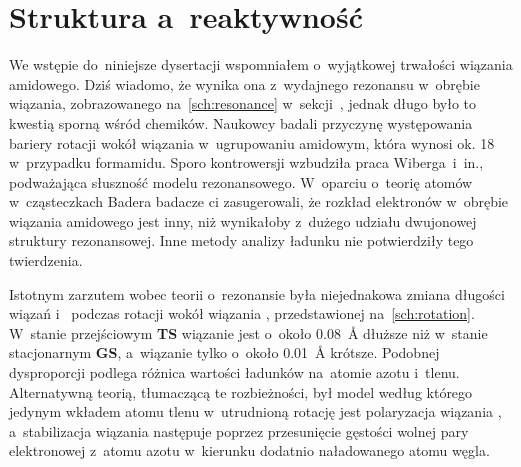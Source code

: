 \section{Struktura a~reaktywność}\label{literature:structure}
We wstępie do~niniejsze dysertacji wspomniałem o~wyjątkowej trwałości wiązania amidowego.
Dziś wiadomo, że wynika ona z~wydajnego rezonansu w~obrębie wiązania, zobrazowanego
  na~\cref{sch:resonance} w~sekcji~, jednak długo
  było to kwestią sporną wśród chemików.
Naukowcy badali przyczynę występowania bariery rotacji wokół wiązania  w~ugrupowaniu
  amidowym, która wynosi ok. \SI{18}{\kcalpm} w~przypadku formamidu.
Sporo kontrowersji wzbudziła praca Wiberga~i~in.,
  podważająca słuszność modelu rezonansowego.
W~oparciu o~teorię atomów w~cząsteczkach
  Badera badacze ci zasugerowali, że rozkład elektronów w~obrębie wiązania amidowego jest inny,
  niż wynikałoby z~dużego udziału dwujonowej struktury rezonansowej.
Inne metody analizy ładunku nie potwierdziły tego twierdzenia.

\begin{marginscheme}
  
  \caption{
    Dysproporcja zmian długości wiązań  i~ między stanem stacjonarnym
      a~stanem przejściowym podczas rotacji wokół wiązania  w~formamidzie.
  }
  \label{sch:rotation}
\end{marginscheme}
Istotnym zarzutem wobec teorii o~rezonansie była niejednakowa zmiana długości wiązań 
  i~ podczas rotacji wokół wiązania , przedstawionej na~\cref{sch:rotation}.
W~stanie przejściowym \textbf{TS} wiązanie  jest o~około \SI{0.08}{\angstrom} dłuższe niż
  w~stanie stacjonarnym \textbf{GS}, a~wiązanie  tylko o~około \SI{0.01}{\angstrom} krótsze.
Podobnej dysproporcji podlega różnica wartości ładunków na~atomie azotu i~tlenu.
Alternatywną teorią, tłumaczącą te rozbieżności, był model według którego jedynym wkładem
  atomu tlenu w~utrudnioną rotację jest polaryzacja wiązania ,
  a~stabilizacja wiązania  następuje poprzez przesunięcie gęstości wolnej pary elektronowej
  z~atomu azotu w~kierunku dodatnio naładowanego atomu węgla.

